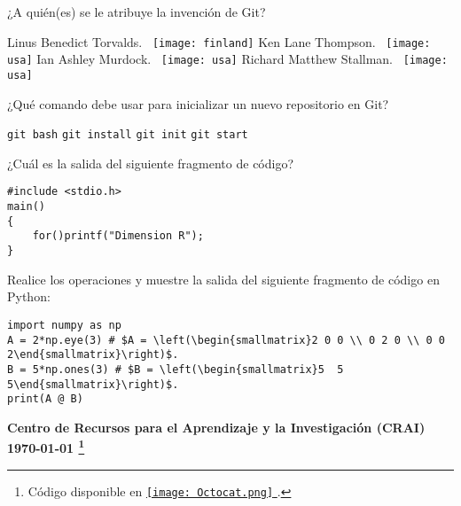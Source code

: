 \documentclass[spanish,addpoints,answers,a4paper]{exam}
\newcommand{\unmarkedfntext}[1]{%
	\begingroup
	\renewcommand\thefootnote{}\footnote{#1}%
	\addtocounter{footnote}{-1}%
	\endgroup
}
\newcommand{\mychar}{%
	\begingroup\normalfont
	\texttt{[image: Octocat.png]}%
	\endgroup
}
\newcommand{\finland}{%
	\begingroup\normalfont
	\texttt{[image: finland]}%
	\endgroup
}
\newcommand{\usa}{%
	\begingroup\normalfont
	\texttt{[image: usa]}%
	\endgroup
}
\begin{document}
\begin{questions}
\begin{solution}
\end{solution}
\question ¿A quién(es) se le atribuye la invención de Git?
\begin{multicols}{2}
\begin{checkboxes}
	\CorrectChoice Linus Benedict Torvalds.\ \finland{} %
	\choice Ken Lane Thompson.\ \usa{}
	\choice Ian Ashley Murdock.\ \usa{}
	\choice Richard Matthew Stallman.\ \usa{}
\end{checkboxes}
\end{multicols}

\question ¿Qué comando debe usar para inicializar un nuevo repositorio en Git?

\begin{multicols}{4}
\begin{checkboxes}
	\choice \texttt{git bash}
	\choice \texttt{git install}
	\CorrectChoice \texttt{git init} %
	\choice \texttt{git start}
\end{checkboxes}
\end{multicols}

\question ¿Cuál es la salida del siguiente fragmento de código?

\begin{verbatim}
#include <stdio.h>
main()
{
	for()printf("Dimension R");
}
\end{verbatim}
\makeemptybox{0.5in}


\question Realice los operaciones y muestre la salida del siguiente fragmento de código en Python:
\begin{verbatim}
import numpy as np
A = 2*np.eye(3) # $A = \left(\begin{smallmatrix}2 0 0 \\ 0 2 0 \\ 0 0 2\end{smallmatrix}\right)$.
B = 5*np.ones(3) # $B = \left(\begin{smallmatrix}5  5  5\end{smallmatrix}\right)$.
print(A @ B)
\end{verbatim}

\makeemptybox{1.2in}

\end{questions}
\vfill
\begin{flushright}\bfseries
Centro de Recursos para el Aprendizaje y la Investigación (CRAI)\\[2mm]
\today\unmarkedfntext{Código disponible en \href{https://github.com/carlosal1015/LaTeX-and-friends}{\mychar{}}.}
\end{flushright}
\end{document}
